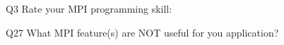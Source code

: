 \begin{description}%
\item{Q3} Rate your MPI programming skill:%
\item{Q27} What MPI feature(s) are NOT useful for you application?%
\end{description}%
